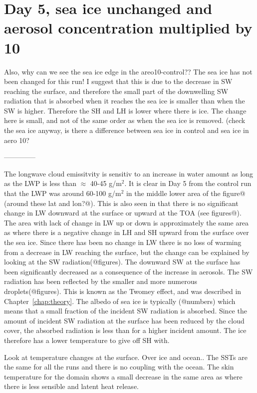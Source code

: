 \section{Day 5, sea ice unchanged and aerosol concentration multiplied by 10}
Also, why can we see the sea ice edge in the areo10-control?? The sea ice has not been changed for this run! I suggest that this is due to the decrease in SW reaching the surface, and therefore the small part of the downwelling SW radiation that is absorbed when it reaches the sea ice is smaller than when the SW is higher. Therefore the SH and LH is lower where there is ice. The change here is small, and not of the same order as when the sea ice is removed. (check the sea ice anyway, is there a difference between sea ice in control and sea ice in aero 10?

--------------

The longwave cloud emissitvity is sensitiv to an increase in water amount as long as the LWP is less than $\approx$ 40-45 g/m$^2$. It is clear in Day 5 from the control run that the LWP was around 60-100 g/m$^2$ in the middle lower area of the figure@ (around these lat and lon?@). This is also seen in that there is no significant change in LW downward at the surface or upward at the TOA (see figures@). The area with lack of change in LW up or down is approximately the same area as where there is a negative change in LH and SH upward from the surface over the sea ice. Since there has been no change in LW there is no loss of warming from a decrease in LW reaching the surface, but the change can be explained by looking at the SW radiation(@figures). The downward SW at the surface has been significantly decreased as a consequence of the increase in aerosols. The SW radiation has been reflected by the smaller and more numerous droplets(@figures). This is known as the Twomey effect, and was described in Chapter~\ref{chap:theory}. The albedo of sea ice is typically (@numbers) which means that a small fraction of the incident SW radiation is absorbed. Since the amount of incident SW radiation at the surface has been reduced by the cloud cover, the absorbed radiation is less than for a higher incident amount. The ice therefore has a lower temperature to give off SH with. 

Look at temperature changes at the surface. Over ice and ocean.. The SSTs are the same for all the runs and there is no coupling with the ocean. The skin temperature for the domain shows a small decrease in the same area as where there is less sensible and latent heat release.

